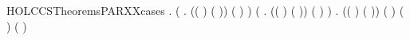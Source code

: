 \begin{SaveVerbatim}{HOLCCSTheoremsPARXXcases}
\HOLTokenTurnstile{} \HOLSymConst{\HOLTokenForall{}}   .
        \HOLSymConst{\ensuremath{\parallel}}  \HOLTokenTransBegin{}\HOLTokenTransEnd {} \HOLSymConst{\HOLTokenImp{}}
       (\HOLSymConst{\HOLTokenExists{}}  .
            (( \HOLSymConst{=} ) \HOLSymConst{\HOLTokenConj{}} ( \HOLSymConst{=} )) \HOLSymConst{\HOLTokenConj{}} ( \HOLSymConst{=}  \HOLSymConst{\ensuremath{\parallel}} ) \HOLSymConst{\HOLTokenConj{}}  \HOLTokenTransBegin{}\HOLTokenTransEnd {}) \HOLSymConst{\HOLTokenDisj{}}
       (\HOLSymConst{\HOLTokenExists{}}  .
            (( \HOLSymConst{=} ) \HOLSymConst{\HOLTokenConj{}} ( \HOLSymConst{=} )) \HOLSymConst{\HOLTokenConj{}} ( \HOLSymConst{=}  \HOLSymConst{\ensuremath{\parallel}} ) \HOLSymConst{\HOLTokenConj{}}  \HOLTokenTransBegin{}\HOLTokenTransEnd {}) \HOLSymConst{\HOLTokenDisj{}}
       \HOLSymConst{\HOLTokenExists{}}    .
           (( \HOLSymConst{=} ) \HOLSymConst{\HOLTokenConj{}} ( \HOLSymConst{=} )) \HOLSymConst{\HOLTokenConj{}} ( \HOLSymConst{=} \HOLConst{\ensuremath{\tau}}) \HOLSymConst{\HOLTokenConj{}} ( \HOLSymConst{=}  \HOLSymConst{\ensuremath{\parallel}} ) \HOLSymConst{\HOLTokenConj{}}
            \HOLTokenTransBegin{} \HOLTokenTransEnd {} \HOLSymConst{\HOLTokenConj{}}  \HOLTokenTransBegin{} ( )\HOLTokenTransEnd {}
\end{SaveVerbatim}
